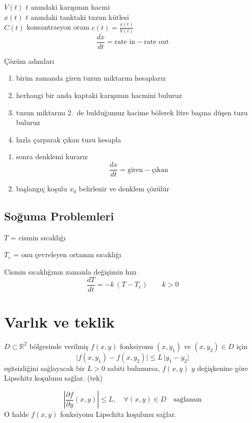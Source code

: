 \documentclass[11pt,a4paper]{article}
\begin{document}
$V(t)$ $t$ anındaki karışımın hacmi\\
$x(t)$ $t$ anındaki tanktaki tuzun kütlesi\\
$C(t)$ konsantrasyon oranı $\displaystyle c(t)=\frac{x(t)}{V(t)}$
\[
  \frac{dx}{dt} = \text{rate in} - \text{rate out}
\]

Çözüm adımları
\begin{enumerate}[label=\arabic*.]
  \item birim zamanda giren tuzun miktarını hesaplarız
  \item herhangi bir anda kaptaki karışımın hacmini buluruz
  \item tuzun miktarını 2.\ de bulduğumuz hacime bölerek litre başına düşen tuzu buluruz
  \item hızla çarparak çıkan tuzu hesapla
\end{enumerate}

\begin{enumerate}[label=\arabic*., start=5]
  \item sonra denklemi kurarız
  \[ \frac{dx}{dt} = \text{giren} - \text{çıkan} \]
  \item başlangıç koşulu $x_0$ belirlenir ve denklem çözülür
\end{enumerate}

\subsection{Soğuma Problemleri}
$T$ = cismin sıcaklığı

$T_e$ = onu çevreleyen ortamın sıcaklığı

Cismin sıcaklığının zamanla değişimin hızı
\[
  \frac{dT}{dt} = -k\,(T - T_e) \qquad k>0
\]

\section{Varlık ve teklik}

\begin{tanim}
  $D\subset\mathbb{R}^2$ bölgesinde verilmiş $f(x,y)$ fonksiyonu $(x,y_1)$ ve $(x,y_2)\in D$ için
  \[
    \lvert f(x,y_1)-f(x,y_2)\rvert \le L\,\lvert y_1-y_2\rvert
  \]
  eşitsizliğini sağlayacak bir $L>0$ sabiti bulunursa, $f(x,y)$ $y$ değişkenine göre
  \textcolor{kirmizikalem}{Lipschitz} koşulunu sağlar. (tek)
\end{tanim}

\begin{teorem}
  \[
    \left\lvert \frac{\partial f}{\partial y}(x,y)\right\rvert \le L, \quad \forall (x,y)\in D \quad \text{sağlansın}
  \]
  O halde $f(x,y)$ fonksiyonu Lipschitz koşulunu sağlar.
\end{teorem}
\end{document}
